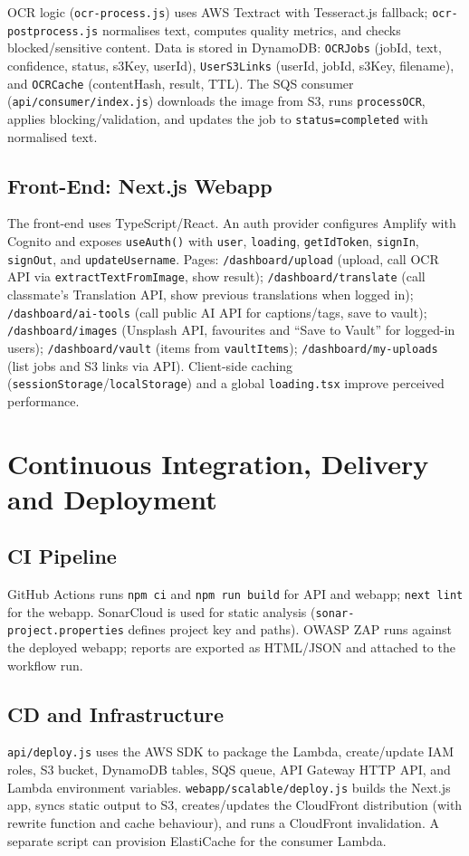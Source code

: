 \documentclass[conference]{IEEEtran}
\begin{document}
OCR logic (\texttt{ocr-process.js}) uses AWS Textract with Tesseract.js fallback; \texttt{ocr-postprocess.js} normalises text, computes quality metrics, and checks blocked/sensitive content. Data is stored in DynamoDB: \texttt{OCRJobs} (jobId, text, confidence, status, s3Key, userId), \texttt{UserS3Links} (userId, jobId, s3Key, filename), and \texttt{OCRCache} (contentHash, result, TTL). The SQS consumer (\texttt{api/consumer/index.js}) downloads the image from S3, runs \texttt{processOCR}, applies blocking/validation, and updates the job to \texttt{status=completed} with normalised text.

\subsection{Front-End: Next.js Webapp}
The front-end uses TypeScript/React. An auth provider configures Amplify with Cognito and exposes \texttt{useAuth()} with \texttt{user}, \texttt{loading}, \texttt{getIdToken}, \texttt{signIn}, \texttt{signOut}, and \texttt{updateUsername}. Pages: \texttt{/dashboard/upload} (upload, call OCR API via \texttt{extractTextFromImage}, show result); \texttt{/dashboard/translate} (call classmate's Translation API, show previous translations when logged in); \texttt{/dashboard/ai-tools} (call public AI API for captions/tags, save to vault); \texttt{/dashboard/images} (Unsplash API, favourites and ``Save to Vault'' for logged-in users); \texttt{/dashboard/vault} (items from \texttt{vaultItems}); \texttt{/dashboard/my-uploads} (list jobs and S3 links via API). Client-side caching (\texttt{sessionStorage}/\texttt{localStorage}) and a global \texttt{loading.tsx} improve perceived performance.

\section{Continuous Integration, Delivery and Deployment}

\subsection{CI Pipeline}
GitHub Actions runs \texttt{npm ci} and \texttt{npm run build} for API and webapp; \texttt{next lint} for the webapp. SonarCloud is used for static analysis (\texttt{sonar-project.properties} defines project key and paths). OWASP ZAP runs against the deployed webapp; reports are exported as HTML/JSON and attached to the workflow run.

\subsection{CD and Infrastructure}
\texttt{api/deploy.js} uses the AWS SDK to package the Lambda, create/update IAM roles, S3 bucket, DynamoDB tables, SQS queue, API Gateway HTTP API, and Lambda environment variables. \texttt{webapp/scalable/deploy.js} builds the Next.js app, syncs static output to S3, creates/updates the CloudFront distribution (with rewrite function and cache behaviour), and runs a CloudFront invalidation. A separate script can provision ElastiCache for the consumer Lambda.
\end{document}
